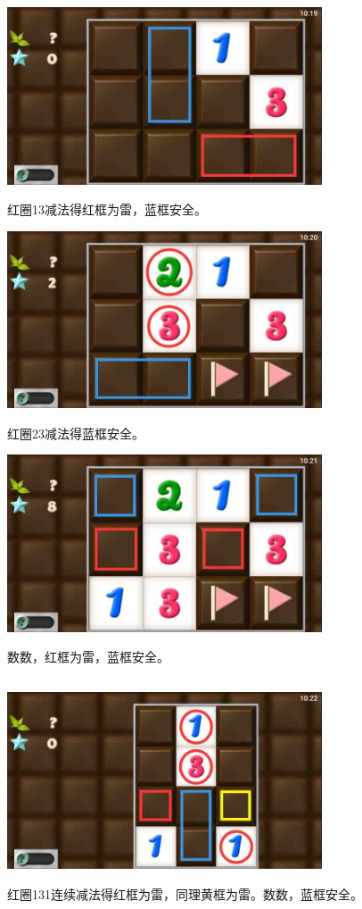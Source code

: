 \subsection{} %
\begin{center}
    \includegraphics[width=0.7\textwidth]{puzzlelow/19-1.jpg}
\end{center}
红圈13减法得红框为雷，蓝框安全。
\begin{center}
    \includegraphics[width=0.7\textwidth]{puzzlelow/19-2.jpg}
\end{center}
红圈23减法得蓝框安全。
\begin{center}
    \includegraphics[width=0.7\textwidth]{puzzlelow/19-3.jpg}
\end{center}
数数，红框为雷，蓝框安全。

\subsection{} %
\begin{center}
    \includegraphics[width=0.7\textwidth]{puzzlelow/20-1.jpg}
\end{center}
红圈131连续减法得红框为雷，同理黄框为雷。数数，蓝框安全。

